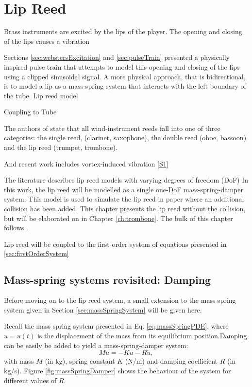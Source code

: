 \chapter{Lip Reed}\label{ch:lipreed}
Brass instruments are excited by the lips of the player. The opening and closing of the lips causes a vibration

Sections \ref{sec:webstersExcitation} and \ref{sec:pulseTrain} presented a physically inspired pulse train that attempts to model this opening and closing of the lips using a clipped sinusoidal signal. A more physical approach, that is bidirectional, is to model a lip as a mass-spring system that interacts with the left boundary of the tube.
Lip reed model



Coupling to Tube

The authors of \cite{Fletcher1998} state that all wind-instrument reeds fall into one of three categories: the single reed, (clarinet, saxophone), the double reed (oboe, bassoon) and the lip reed (trumpet, trombone). 

And recent work includes vortex-induced vibration [\hyperref[ch:listOfPublications]{S1}] 

The literature describes lip reed models with varying degrees of freedom (DoF)
In this work, the lip reed will be modelled as a single one-DoF mass-spring-damper system. This model is used to simulate the lip reed in paper \citeP[H] where an additional collision has been added. This chapter presents the lip reed without the collision, but will be elaborated on in Chapter \ref{ch:trombone}.  The bulk of this chapter follows \cite{Harrison2018}. 

Lip reed will be coupled to the first-order system of equations presented in \ref{sec:firstOrderSystem} 



\section{Mass-spring systems revisited: Damping}\label{sec:massSpringDamping}
Before moving on to the lip reed system, a small extension to the mass-spring system given in Section \ref{sec:massSpringSystem} will be given here. 

Recall the mass spring system presented in Eq. \eqref{eq:massSpringPDE}, where $u=u(t)$ is the displacement of the mass from its equilibrium position.Damping can be easily be added to yield a mass-spring-damper system: 
\begin{equation}\label{eq:massSpringDampingPDE}
    M\ddot u = -Ku - R\dot u,
\end{equation}
with mass $M$ (in kg), spring constant $K$ (N/m) and damping coefficient $R$ (in kg/s). Figure \ref{fig:massSpringDamper} shows the behaviour of the system for different values of $R$. 

